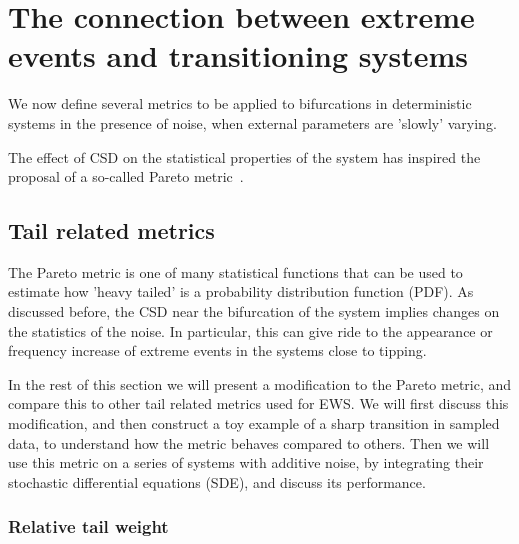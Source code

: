 \section{The connection between extreme events and transitioning systems}



We now define several metrics to be applied to bifurcations in deterministic systems in the presence of noise, when external parameters are 'slowly' varying.

The effect of CSD on the statistical properties of the system has inspired the proposal of a  so-called Pareto metric~\cite{Kasparian_pareto}.


\subsection{Tail related metrics}

The Pareto metric is one of many statistical functions that can be used to estimate  how 'heavy tailed' is a  probability distribution function (PDF). As discussed before, the CSD near the bifurcation of the system implies changes on the statistics of the noise.
In particular, this can give ride to  the appearance or frequency increase of extreme events in the systems close to tipping. 

In the rest of this section we will present a modification to the Pareto metric, and compare this to other tail related metrics used for EWS. We will first discuss this modification, and then construct a toy example of a sharp transition in sampled data, to understand how the metric behaves compared to others. 
Then we will use this metric on a series of systems with additive noise, by integrating  their stochastic differential equations (SDE), and discuss its performance. 

\subsubsection{Relative tail weight}

